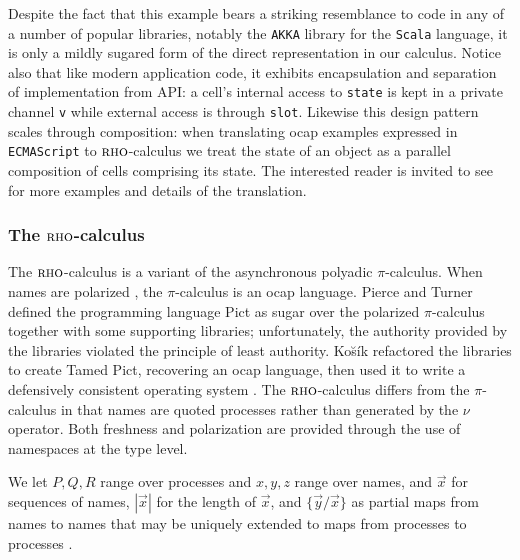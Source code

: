 \documentclass[submission,copyright,creativecommons]{eptcs}
\newcommand{\pzero}{\mathbin{0}}
\newcommand{\bc}{\mathbin{\mathbf{::=}}}
\numberwithin{equation}{subsection}
\newcommand{\pic}{$\pi$-calculus}
\newcommand{\rhoc}{${\textsc{rho}}$-calculus}
\begin{document}
Despite the fact that this example bears a striking resemblance to
code in any of a number of popular libraries, notably the {\tt AKKA}
library for the {\tt Scala} language, it is only a mildly sugared form
of the direct representation in our calculus. Notice also that like
modern application code, it exhibits encapsulation and separation of
implementation from API: a cell's internal access to {\tt state} is
kept in a private channel {\tt v} while external access is through
{\tt slot}. Likewise this design pattern scales through composition:
when translating ocap examples expressed in {\tt ECMAScript} to
\rhoc\; we treat the state of an object as a parallel composition of
cells comprising its state. The interested reader is invited to see
\cite{DBLP:Journals/Corr/MeredithSD13} for more examples and details
of the translation.

\subsubsection{The \rhoc}

The {\rhoc} \cite{DBLP:journals/entcs/MeredithR05}
is a variant of the asynchronous polyadic {\pic}.  When names are
polarized \cite{conf/fsttcs/Odersky95}, the {\pic} is an ocap
language.  Pierce and Turner \cite{PierceTurner:PictDesign}
defined the programming language Pict as sugar over the polarized {\pic}
together with some supporting libraries; unfortunately, the authority
provided by the libraries violated the principle of least authority.
Ko\u{s}\'{i}k refactored the libraries to create Tamed Pict, recovering
an ocap language, then used it to write a defensively consistent
operating system \cite{kosik:dep}. The {\rhoc} differs from the 
{\pic} in that names are quoted processes
rather than generated by the $\nu$ operator.  Both freshness and 
polarization are provided through the use of namespaces at the type level.

We let ${P, Q, R}$ range over processes and ${x, y, z}$ range over
names, and $\vec{x}$ for sequences of names, $|\vec{x}|$ for the
length of $\vec{x}$, and $\{ \vec{y} / \vec{x} \}$ as partial maps from
names to names that may be uniquely extended to maps from processes to
processes \cite{DBLP:journals/entcs/MeredithR05}.

\end{document}
